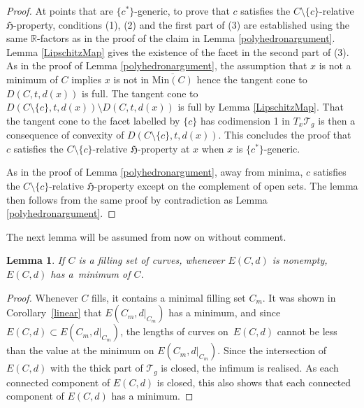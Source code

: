 \documentclass[pdftex]{sigma}
\numberwithin{equation}{section}
\newtheorem{Lemma}[Theorem]{Lemma}
\begin{document}
\begin{proof}
At points that are $\{c^{*}\}$-generic, to prove that $c$ satisfies the $C\setminus \{c\}$-relative $\mathfrak{H}$-property, conditions (1), (2) and the first part of (3) are established using the same $\mathbb{R}$-factors as in the proof of the claim in Lemma \ref{polyhedronargument}. Lemma \ref{LipschitzMap} gives the existence of the facet in the second part of (3). As in the proof of Lemma \ref{polyhedronargument}, the assumption that $x$ is not a minimum of $C$ implies $x$ is not in $\overline{\mathrm{Min}(C)}$ hence the tangent cone to $D(C,t,d(x))$ is full. The tangent cone to~${D(C\setminus \{c\},t,d(x))\setminus D(C,t,d(x))}$ is full by Lemma \ref{LipschitzMap}. That the tangent cone to the facet labelled by $\{c\}$ has codimension 1 in $T_{x}\mathcal{T}_{g}$ is then a consequence of convexity of $D(C\setminus \{c\},t,d(x))$. This concludes the proof that $c$ satisfies the $C\setminus \{c\}$-relative $\mathfrak{H}$-property at $x$ when $x$ is $\{c^{*}\}$-generic.

As in the proof of Lemma \ref{polyhedronargument}, away from minima, $c$ satisfies the $C\setminus \{c\}$-relative $\mathfrak{H}$-property except on the complement of open sets. The lemma then follows from the same proof by contradiction as Lemma \ref{polyhedronargument}.
\end{proof}

The next lemma will be assumed from now on without comment.

\begin{Lemma}
\label{connectedminima}
If $C$ is a filling set of curves, whenever $E(C,d)$ is nonempty, $E(C,d)$ has a~minimum of $C$.
\end{Lemma}
\begin{proof}
Whenever $C$ fills, it contains a minimal filling set $C_{m}$. It was shown in Corollary~\ref{linear} that $E(C_{m}, d|_{C_{m}})$ has a minimum, and since $E(C,d)\subset E(C_{m}, d|_{C_{m}})$, the lengths of curves on~$E(C,d)$ cannot be less than the value at the minimum on $E(C_{m}, d|_{C_{m}})$. Since the intersection of $E(C,d)$ with the thick part of $\mathcal{T}_{g}$ is closed, the infimum is realised. As each connected component of $E(C,d)$ is closed, this also shows that each connected component of $E(C,d)$ has a minimum.
\end{proof}
\end{document}
